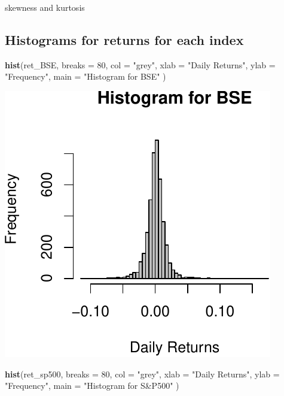 \documentclass[11pt,]{article}
\newenvironment{Shaded}{\begin{snugshade}}{\end{snugshade}}
\newcommand{\KeywordTok}[1]{\textcolor[rgb]{0.13,0.29,0.53}{\textbf{#1}}}
\newcommand{\DataTypeTok}[1]{\textcolor[rgb]{0.13,0.29,0.53}{#1}}
\newcommand{\DecValTok}[1]{\textcolor[rgb]{0.00,0.00,0.81}{#1}}
\newcommand{\StringTok}[1]{\textcolor[rgb]{0.31,0.60,0.02}{#1}}
\newcommand{\NormalTok}[1]{#1}
\begin{document}
skewness and kurtosis

\subsection{Histograms for returns for each
index}\label{histograms-for-returns-for-each-index}

\begin{Shaded}
\begin{Highlighting}[]
\KeywordTok{hist}\NormalTok{(ret_BSE,}
     \DataTypeTok{breaks =} \DecValTok{80}\NormalTok{,}
     \DataTypeTok{col =} \StringTok{"grey"}\NormalTok{,}
     \DataTypeTok{xlab =} \StringTok{"Daily Returns"}\NormalTok{,}
     \DataTypeTok{ylab =} \StringTok{"Frequency"}\NormalTok{,}
     \DataTypeTok{main =} \StringTok{"Histogram for BSE"}
\NormalTok{     )}
\end{Highlighting}
\end{Shaded}

\begin{center}\includegraphics{FMC_T4_PhD_Fin_Time_Series_files/figure-latex/histograms-1} \end{center}

\begin{Shaded}
\begin{Highlighting}[]
\KeywordTok{hist}\NormalTok{(ret_sp500,}
     \DataTypeTok{breaks =} \DecValTok{80}\NormalTok{,}
     \DataTypeTok{col =} \StringTok{"grey"}\NormalTok{,}
     \DataTypeTok{xlab =} \StringTok{"Daily Returns"}\NormalTok{,}
     \DataTypeTok{ylab =} \StringTok{"Frequency"}\NormalTok{,}
     \DataTypeTok{main =} \StringTok{"Histogram for S&P500"}
\NormalTok{     )}
\end{Highlighting}
\end{Shaded}
\end{document}
